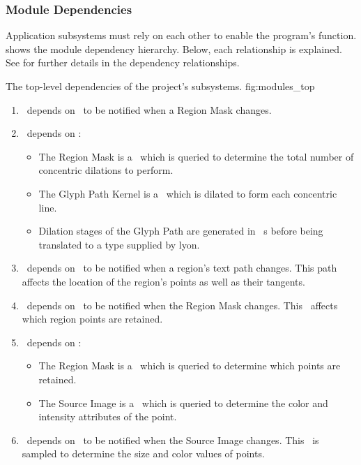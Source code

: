 {  \subsubsection{Module Dependencies}
  Application subsystems must rely on each other to enable the program's function.
   shows the module dependency hierarchy.
  Below, each relationship is explained.
  See  for further details in the dependency relationships.

  {The top-level dependencies of the project's subsystems.}
  {fig:modules_top}
  {\diagsize}

  \begin{enumerate}
    \item \linemod\ depends on \regmod\ to be notified when a Region Mask changes.
    \item \linemod\ depends on \bmmod:
          \begin{itemize}
            \item The Region Mask is a \bmtype\ which is queried to determine the total number of concentric dilations to perform.
            \item The Glyph Path Kernel is a \bmtype\ which is dilated to form each concentric line.
            \item Dilation stages of the Glyph Path are generated in \bmtype\ s before being translated to a type supplied by lyon.
          \end{itemize}
    \item \ptmod\ depends on \linemod\ to be notified when a region's text path changes.  This path affects the location of the region's points as well as their tangents.
    \item \ptmod\ depends on \regmod\ to be notified when the Region Mask changes.  This \bmtype\ affects which region points are retained.
    \item \ptmod\ depends on \bmmod:
          \begin{itemize}
            \item The Region Mask is a \bmtype\ which is queried to determine which points are retained.
            \item The Source Image is a \bmtype\ which is queried to determine the color and intensity attributes of the point.
          \end{itemize}
    \item \ptmod\ depends on \srcmod\ to be notified when the Source Image changes.  This \bmtype\ is sampled to determine the size and color values of points.

\end{enumerate}}
